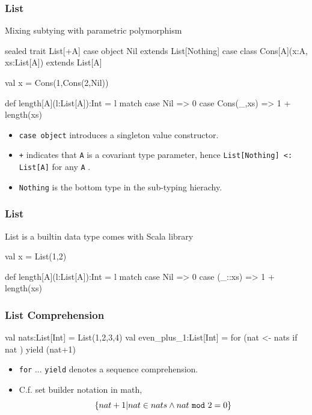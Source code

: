 \documentclass{beamer}
\newcommand{\beb}{\begin{exampleblock}}
\newcommand{\eeb}{\end{exampleblock}}
\begin{document}
\begin{frame}[fragile]
\frametitle{List}

\beb{Mixing subtying with parametric polymorphism}
\begin{code}
sealed trait List[+A]
case object Nil extends List[Nothing]
case class Cons[A](x:A, xs:List[A]) extends List[A]

val x = Cons(1,Cons(2,Nil))

def length[A](l:List[A]):Int = l match {
   case Nil => 0
   case Cons(_,xs) => 1 + length(xs)
}
\end{code}
\eeb
\begin{itemize}
 \item {\tt case object} introduces a singleton value constructor.
 \item {\tt +} indicates that {\tt A} is a covariant type parameter,
   hence {\tt List[Nothing] <: List[A]} for any {\tt A} .
 \item {\tt Nothing} is the bottom type in the sub-typing hierachy.
\end{itemize}
\end{frame}


\begin{frame}[fragile]
\frametitle{List}

List is a builtin data type comes with Scala library
\beb{}
\begin{code}
val x = List(1,2)

def length[A](l:List[A]):Int = l match {
   case Nil => 0
   case (_::xs) => 1 + length(xs)
}
\end{code}
\eeb
\end{frame}


\begin{frame}[fragile]
\frametitle{List Comprehension}
\beb{}
\begin{code}
val nats:List[Int] = List(1,2,3,4)
val even_plus_1:List[Int] = for (nat <- nats
                                 if nat %
                                ) yield (nat+1)
\end{code}
\eeb
\begin{itemize}
 \item {\tt for} ... {\tt yield} denotes a sequence comprehension. 
 \item C.f. set builder notation in math,  
$$
\{ nat + 1 | nat \in nats \wedge nat~ {\tt mod}~ 2 = 0 \}
$$
\end{itemize}
\end{frame}
\end{document}

